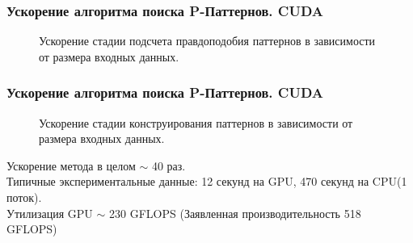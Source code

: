 \documentclass[smaller]{beamer}
\begin{document}
\begin{frame}
  \frametitle{Ускорение алгоритма поиска P-Паттернов. CUDA}
\begin{figure}[H]
	\caption{Ускорение стадии подсчета правдоподобия паттернов в зависимости от размера входных данных.}
\end{figure}

\end{frame}

\begin{frame}
  \frametitle{Ускорение алгоритма поиска P-Паттернов. CUDA}
\begin{figure}[H]
	\caption{Ускорение стадии конструирования паттернов в зависимости от размера входных данных.}
\end{figure}

Ускорение метода в целом $\sim$ 40 раз. \\
Типичные экспериментальные данные: 12 секунд на GPU, 470 секунд на CPU(1 поток).\\
Утилизация GPU $\sim$ 230 GFLOPS (Заявленная производительность 518 GFLOPS)

\end{frame}
\end{document}
